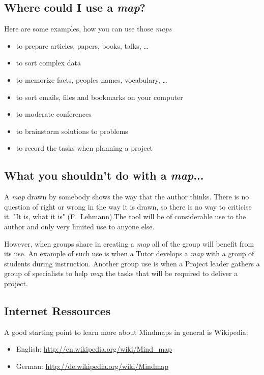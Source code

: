 \documentclass[12pt,a4paper]{article}
\begin{document}
\subsection{Where could I use a {\em map}?}
Here are some examples, how you can use those {\em maps}
\begin{itemize}
    \item to prepare articles, papers, books, talks, \ldots
    \item to sort complex data
    \item to memorize facts, peoples names, vocabulary, \ldots
    \item to sort emails, files and bookmarks on your computer
    \item to moderate conferences
    \item to brainstorm solutions to problems
    \item to record the tasks when planning a project
\end{itemize}

\subsection{What you shouldn't do with a {\em map}...}
A {\em map} drawn by somebody shows the way that the author thinks.
There is no question of right or wrong in the way it is drawn, so there
is no way to criticise it. "It is, what it is" ({\sc F.~Lehmann}).The
tool will be of considerable use to the author and only very limited use
to anyone else. 

However, when groups share in creating a {\em map} all of the group will
benefit from its use. An example of such use is when a Tutor develops a
{\em map} with a group of students during instruction. Another group use
is when a Project leader gathers a group of specialists to help {\em
map} the tasks that will be required to deliver a project.


\subsection{Internet Ressources} 
A good starting point to learn more about Mindmaps in general is Wikipedia:
\begin{itemize}
    \item English: 
        \href{http://en.wikipedia.org/wiki/Mind_map}{http://en.wikipedia.org/wiki/Mind\_map}
    \item German: 
        \href{http://de.wikipedia.org/wiki/Mindmap}{http://de.wikipedia.org/wiki/Mindmap}
\end{itemize}
\end{document}
